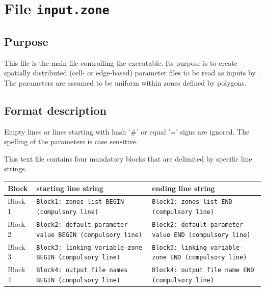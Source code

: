 \section{File \texttt{input.zone}}
\subsection{Purpose}
This file is the main file controlling the \swZone executable. Its purpose is to create spatially distributed (cell- or edge-based) parameter files to be read as inputs by \swSolver. The parameters are assumed to be uniform within zones defined by polygons.
%
\subsection{Format description}
Empty lines or lines starting with hash '\#' or equal '=' signs are ignored. The spelling of the parameters is case sensitive.

This text file contains four mandatory blocks that are delimited by specific line strings.

\begin{scriptsize}
\begin{tabular}{l | l | l}
\hline
Block & starting line string & ending line string \\
\hline
Block 1 & \texttt{Block1: zones list BEGIN (compulsory line)} & \texttt{Block1: zones list END (compulsory line)} \\
Block 2 & \texttt{Block2: default parameter value BEGIN (compulsory line)} & \texttt{Block2: default parameter value END (compulsory line)} \\
Block 3 & \texttt{Block3: linking variable-zone BEGIN (compulsory line)} & \texttt{Block3: linking variable-zone END (compulsory line)} \\
Block 4 & \texttt{Block4: output file names BEGIN (compulsory line)} & \texttt{Block4: output file name END (compulsory line)} \\
\hline
\end{tabular}
\end{scriptsize}

